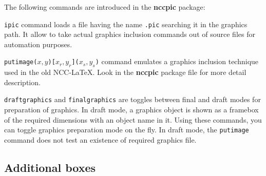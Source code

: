 \documentclass[11pt]{ncc}
\newcommand*\package[1]{\textbf{#1}}
\newcommand*\Meta[1]{\texttt{\upshape#1}}
\newcommand*\com[1]{\Meta{\symbol{"5C}#1}}
\newcommand*\meta[1]{\Meta{\symbol{"7B}{\itshape #1}\symbol{"7D}}}
\begin{document}
The following commands are introduced in the \package{nccpic}
package:
\begin{desclist}{}{}
\item[\com{ipic}\meta{filename}] command loads a file having the
name \Meta{{\itshape filename}.pic} searching it in the graphics
path. It allow to take actual graphics inclusion commands out of
source files for automation purposes.

\item[\com{putimage}\Meta{($x,y$)[$x_r,y_r$]($x_s,y_s$)}\meta{filename}]
command emulates a graphics inclusion technique used in the old
NCC-\LaTeX. Look in the \package{nccpic} package file for more
detail description.

\item[\com{draftgraphics} and \com{finalgraphics}] are toggles
between final and draft modes for preparation of graphics. In
draft mode, a graphics object is shown as a framebox of the
required dimensions with an object name in it. Using these
commands, you can toggle graphics preparation mode on the fly. In
draft mode, the \com{putimage} command does not test an existence
of required graphics file.
\end{desclist}

\subsection{Additional boxes}
\end{document}
